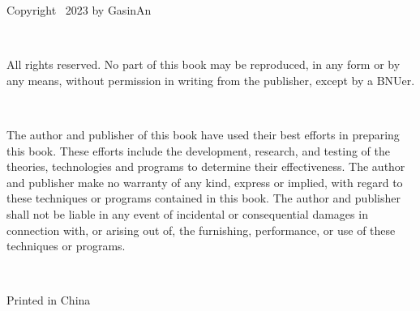 \noindent Copyright \textcopyright~2023 by GasinAn

\ 

\noindent All rights reserved. No part of this book may be reproduced, 
in any form or by any means, without permission in writing from the publisher, except by a BNUer.

\ 

\noindent The author and publisher of this book have used their best efforts
in preparing this book. These efforts include the development, research, and testing of the theories,
technologies and programs to determine their effectiveness.
The author and publisher make no warranty of any kind, express or implied,
with regard to these techniques or programs contained in this book.
The author and publisher shall not be liable in any event of incidental or consequential damages
in connection with, or arising out of, the furnishing, performance, or use of these techniques or programs.

\ 

\noindent Printed in China
